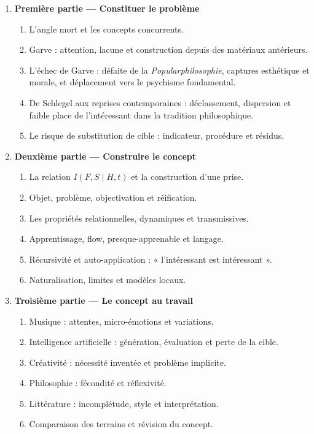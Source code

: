\documentclass[11pt,a4paper]{article}
\begin{document}
\begin{enumerate}
  \item \textbf{Première partie --- Constituer le problème}
    \begin{enumerate}
      \item L'angle mort et les concepts concurrents.
      \item Garve : attention, lacune et construction depuis des matériaux
            antérieurs.
      \item L'échec de Garve : défaite de la \emph{Popularphilosophie}, captures
            esthétique et morale, et déplacement vers le psychisme fondamental.
      \item De Schlegel aux reprises contemporaines : déclassement, dispersion
            et faible place de l'intéressant dans la tradition philosophique.
      \item Le risque de substitution de cible : indicateur, procédure et résidus.
    \end{enumerate}
  \item \textbf{Deuxième partie --- Construire le concept}
    \begin{enumerate}
      \item La relation \(I(F,S\mid H,t)\) et la construction d'une prise.
      \item Objet, problème, objectivation et réification.
      \item Les propriétés relationnelles, dynamiques et transmissives.
      \item Apprentissage, flow, presque-apprenable et langage.
      \item Récursivité et auto-application : « l'intéressant est intéressant ».
      \item Naturalisation, limites et modèles locaux.
    \end{enumerate}
  \item \textbf{Troisième partie --- Le concept au travail}
    \begin{enumerate}
      \item Musique : attentes, micro-émotions et variations.
      \item Intelligence artificielle : génération, évaluation et perte de la
            cible.
      \item Créativité : nécessité inventée et problème implicite.
      \item Philosophie : fécondité et réflexivité.
      \item Littérature : incomplétude, style et interprétation.
      \item Comparaison des terrains et révision du concept.
    \end{enumerate}
\end{enumerate}
\end{document}
